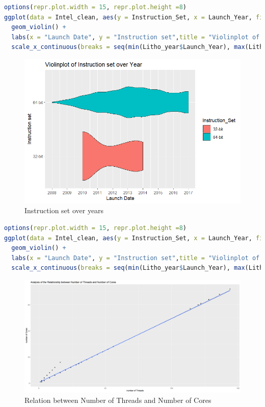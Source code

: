 \begin{lstlisting}[language=R]
options(repr.plot.width = 15, repr.plot.height =8) 
ggplot(data = Intel_clean, aes(y = Instruction_Set, x = Launch_Year, fill = Instruction_Set)) +
  geom_violin() +
  labs(x = "Launch Date", y = "Instruction set",title = "Violinplot of Instruction set over Year") +
  scale_x_continuous(breaks = seq(min(Litho_year$Launch_Year), max(Litho_year$Launch_Year), by = 1))
\end{lstlisting}

\begin{figure}[ht]
  \centering
  \includegraphics[width=1\linewidth]{img/6432bit_year.png}
  \vspace{1pt}
  \caption{Instruction set over years}
\end{figure}

\begin{lstlisting}[language=R]
options(repr.plot.width = 15, repr.plot.height =8) 
ggplot(data = Intel_clean, aes(y = Instruction_Set, x = Launch_Year, fill = Instruction_Set)) +
  geom_violin() +
  labs(x = "Launch Date", y = "Instruction set",title = "Violinplot of Instruction set over Year") +
  scale_x_continuous(breaks = seq(min(Litho_year$Launch_Year), max(Litho_year$Launch_Year), by = 1))
\end{lstlisting}

\begin{figure}[ht]
  \centering
  \includegraphics[width=1\linewidth]{img/CPU_ThreadCore.png}
  \vspace{1pt}
  \caption{Relation between Number of Threads and Number of Cores}
\end{figure}

